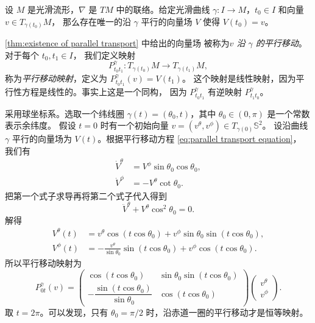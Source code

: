 \begin{theorem}[平行移动的存在性]\label{thm:existence of parallel transport}
  设 $M$ 是光滑流形，$\nabla$ 是 $TM$ 中的联络。给定光滑曲线
  $\gamma:I\to M$，$t_0\in I$ 和向量 $v\in T_{\gamma(t_0)}M$，
  那么存在唯一的沿 $\gamma$ 平行的向量场 $V$ 使得 $V(t_0)=v$。
\end{theorem}

\autoref{thm:existence of parallel transport} 中给出的向量场
被称为\emph{$v$ 沿 $\gamma$ 的平行移动}。对于每个 $t_0,t_1\in I$，
我们定义映射
\begin{equation}
  P_{t_0t_1}^\gamma:T_{\gamma(t_0)}M\to T_{\gamma(t_1)}M,
\end{equation}
称为\emph{平行移动映射}，定义为 $P_{t_0t_1}^\gamma(v)=V(t_1)$。
这个映射是线性映射，因为平行性方程是线性的。事实上这是一个同构，
因为 $P_{t_0t_1}^\gamma$ 有逆映射 $P_{t_1t_0}^\gamma$。

\begin{example}
  采用球坐标系。选取一个纬线圈 $\gamma(t)=(\theta_0,t)$，其中 $\theta_0\in (0,\pi)$ 是一个常数
  表示余纬度。
  假设 $t=0$ 时有一个初始向量 $v=(v^\theta,v^\phi)\in T_{\gamma(0)}\mathbb{S}^2$。
  设沿曲线 $\gamma$ 平行的向量场为 $V(t)$。根据平行移动方程 \eqref{eq:parallel transport equation}，
  我们有
  \begin{align*}
    \dot V^\theta&= V^\phi \sin\theta_0\cos\theta_0,\\
    \dot V^\phi&=-V^\theta \cot\theta_0.
  \end{align*}
  把第一个式子求导再将第二个式子代入得到
  \[
    \ddot V^\theta+V^\theta \cos^2\theta_0=0.
  \]
  解得
  \begin{align*}
    V^\theta(t)&=v^\theta \cos(t\cos\theta_0)+v^\phi\sin\theta_0\sin(t\cos\theta_0),\\
    V^\phi(t)&=-\frac{v^\theta}{\sin\theta_0}\sin(t\cos\theta_0)+v^\phi\cos(t\cos\theta_0).
  \end{align*}
  所以平行移动映射为
  \[
     P_{0t}^\gamma(v)=
     \begin{pmatrix}
      \cos(t\cos\theta_0) & \sin\theta_0\sin(t\cos\theta_0)\\[2mm]
      -\dfrac{\sin(t\cos\theta_0)}{\sin\theta_0} & \cos(t\cos\theta_0)
     \end{pmatrix}
     \begin{pmatrix}
      v^\theta\\
      v^\phi
     \end{pmatrix}.
  \]
  取 $t=2\pi$。可以发现，只有 $\theta_0=\pi/2$ 时，沿赤道一圈的平行移动才是恒等映射。
\end{example}

